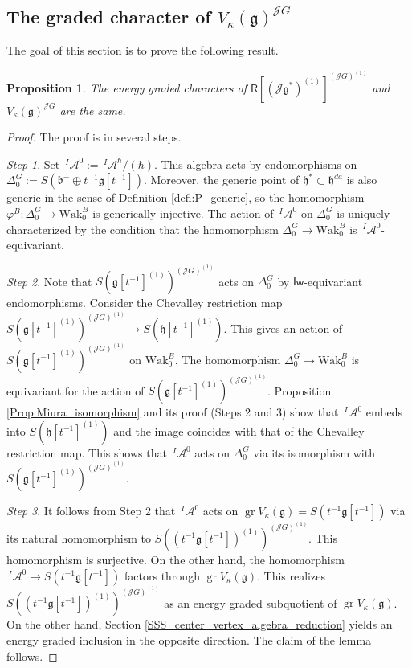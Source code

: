 \documentclass{amsart}
\newtheorem{Prop}[Thm]{Proposition}
\theoremstyle{definition}
\newcommand{\on}{\mathrm}
\newcommand{\Ring}{\mathsf{R}}
\newcommand{\g}{\mathfrak{g}}
\newcommand{\gr}{\operatorname{gr}}
\newcommand{\h}{\mathfrak{h}}
\newcommand{\Wak}{\on{Wak}}
\newcommand{\A}{\mathscr{A}}
\newcommand{\Jet}{\mathscr{J}}
\newcommand{\Iw}{\mathsf{Iw}}
\numberwithin{equation}{section}
\begin{document}
\subsection{The graded character of $V_\kappa(\g)^{\Jet G}$}
The goal of this section is to prove the following result.

\begin{Prop}\label{Prop:graded_characters}
The energy graded characters of $\Ring[(\Jet \g^*)^{(1)}]^{(\Jet G)^{(1)}}$
and $V_\kappa(\g)^{\Jet G}$ are the same.
\end{Prop}
\begin{proof}
The proof is in several steps. 

{\it Step 1}.
Set $\,^I\!\A^0:=\,^I\!\A^\hbar/(\hbar)$. This algebra acts by endomorphisms on $\Delta^G_0:=S(\mathfrak{b}^-\oplus t^{-1}\g[t^{-1}])$. Moreover, the generic point of $\h^*\subset \h^{da}$ is also generic in the sense of Definition \ref{defi:P_generic}, so the homomorphism 
$\varphi^B:\Delta^G_0\rightarrow \Wak^B_0$ is generically injective. 
The action of $\,^I\A^0$ on $\Delta^G_0$ is uniquely characterized  
by the condition that the homomorphism $\Delta^G_0\rightarrow \Wak^B_0$
is $\,^I\!\A^0$-equivariant. 


{\it Step 2}. 
Note that $S(\g[t^{-1}]^{(1)})^{(\Jet G)^{(1)}}$ acts on $\Delta^G_0$ by $\Iw$-equivariant endomorphisms. Consider the Chevalley restriction map
$S(\g[t^{-1}]^{(1)})^{(\Jet G)^{(1)}}\rightarrow S(\h[t^{-1}]^{(1)})$. This gives an action of $S(\g[t^{-1}]^{(1)})^{(\Jet G)^{(1)}}$ on $\Wak^B_0$. The homomorphism $\Delta^G_0\rightarrow \Wak^B_0$ is equivariant for the action of $S(\g[t^{-1}]^{(1)})^{(\Jet G)^{(1)}}$.
Proposition \ref{Prop:Miura_isomorphism} and its proof (Steps 2 and 3) show that $\,^I\!\A^0$
embeds into $S(\h[t^{-1}]^{(1)})$ and the image coincides with that of the Chevalley restriction map. This shows that $\,^I\!\A^0$ acts on $\Delta^G_0$ via its isomorphism with $S(\g[t^{-1}]^{(1)})^{(\Jet G)^{(1)}}$.

{\it Step 3}. It follows from Step 2 that $\,^I\!\A^0$ acts on $\gr V_\kappa(\g)=S(t^{-1}\g[t^{-1}])$ via its natural homomorphism to
$S\left((t^{-1}\g[t^{-1}])^{(1)}\right)^{(\Jet G)^{(1)}}$. This homomorphism is surjective. On the other hand, the homomorphism $\,^I\!\A^0\rightarrow 
S(t^{-1}\g[t^{-1}])$ factors through $\gr V_\kappa(\g)$. This realizes $S\left((t^{-1}\g[t^{-1}])^{(1)}\right)^{(\Jet G)^{(1)}}$ as an energy graded subquotient of $\gr V_\kappa(\g)$. On the other hand, Section \ref{SSS_center_vertex_algebra_reduction} yields an energy graded inclusion in the opposite direction. The claim of the lemma follows.
\end{proof}
\end{document}

